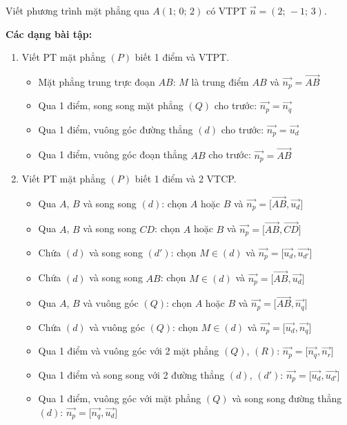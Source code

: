 \documentclass[12pt,a4paper]{article}
\begin{document}
\begin{vidu}
  Viết phương trình mặt phẳng qua $A(1;\, 0;\, 2)$ có VTPT $\vec{n} = (2;\, -1;\, 3)$.
\end{vidu}

\medskip\noindent\textbf{Các dạng bài tập:}
\begin{enumerate}[label=\textbf{Dạng \arabic*:}, leftmargin=*, align=left]
  \item Viết PT mặt phẳng $(P)$ biết 1 điểm và VTPT.
    \begin{itemize}
        \item Mặt phẳng trung trực đoạn $AB$: $M$ là trung điểm $AB$ và $\vec{n_p} = \overrightarrow{AB}$
        \item Qua 1 điểm, song song mặt phẳng $(Q)$ cho trước: $\vec{n_p} = \vec{n_q}$
        \item Qua 1 điểm, vuông góc đường thẳng $(d)$ cho trước: $\vec{n_p} = \vec{u_d}$
        \item Qua 1 điểm, vuông góc đoạn thẳng $AB$ cho trước: $\vec{n_p} = \overrightarrow{AB}$
    \end{itemize}
  \item Viết PT mặt phẳng $(P)$ biết 1 điểm và 2 VTCP.
    \begin{itemize}
        \item Qua $A$, $B$ và song song $(d)$: chọn $A$ hoặc $B$ và $\vec{n_p} = \bigl[\overrightarrow{AB}, \vec{u_d}\bigr]$
        \item Qua $A$, $B$ và song song $CD$: chọn $A$ hoặc $B$ và $\vec{n_p} = \bigl[\overrightarrow{AB}, \overrightarrow{CD}\bigr]$
        \item Chứa $(d)$ và song song $(d')$: chọn $M \in (d)$ và $\vec{n_p} = \bigl[\vec{u_d}, \vec{u_{d'}}\bigr]$
        \item Chứa $(d)$ và song song $AB$: chọn $M \in (d)$ và $\vec{n_p} = \bigl[\overrightarrow{AB}, \vec{u_d}\bigr]$
        \item Qua $A$, $B$ và vuông góc $(Q)$: chọn $A$ hoặc $B$ và $\vec{n_p} = \bigl[\overrightarrow{AB}, \vec{n_q}\bigr]$
        \item Chứa $(d)$ và vuông góc $(Q)$: chọn $M \in (d)$ và $\vec{n_p} = \bigl[\vec{u_d}, \vec{n_q}\bigr]$
        \item Qua 1 điểm và vuông góc với 2 mặt phẳng $(Q)$, $(R)$: $\vec{n_p} = \bigl[\vec{n_q}, \vec{n_r}\bigr]$
        \item Qua 1 điểm và song song với 2 đường thẳng $(d)$, $(d')$: $\vec{n_p} = \bigl[\vec{u_d}, \vec{u_{d'}}\bigr]$
        \item Qua 1 điểm, vuông góc với mặt phẳng $(Q)$ và song song đường thẳng $(d)$: $\vec{n_p} = \bigl[\vec{n_q}, \vec{u_d}\bigr]$

\end{itemize}
\end{enumerate}
\end{document}
